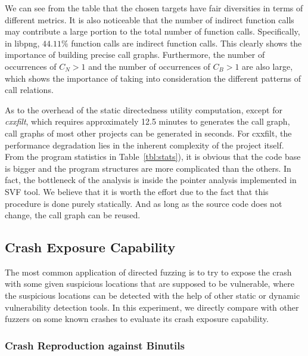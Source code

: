 We can see from  the table that the chosen targets have fair diversities in terms of different metrics.
It is also noticeable that the number of indirect function calls may contribute a large portion to the total number of function calls.
Specifically, in libpng, $44.11\%$ function calls are indirect function calls.
This clearly shows the importance of building precise call graphs.
Furthermore, the number of occurrences of $C_N>1$ and the number of occurrences of $C_B>1$ are also large, which shows the importance of taking into consideration the different patterns of call relations.




As to the overhead of the static directedness utility computation, except for \emph{cxxfilt}, which requires approximately 12.5 minutes to generates the call graph, call graphs of most other projects can be generated in seconds. For cxxfilt, the performance degradation lies in the inherent complexity of the project itself. From the program statistics in Table~\ref{tbl:stats}), it is obvious that the code base is bigger and the program structures are more complicated than the others. In fact, the bottleneck of the analysis is inside the pointer analysis implemented in SVF tool. We believe that it is worth the effort due to the fact that this procedure is done purely statically. And as long as the source code does not change, the call graph can be reused.


\subsection{Crash Exposure Capability}\label{subsec:evalcrashrepro}

The most common application of directed fuzzing is to try to expose the crash with some given suspicious locations that are supposed to be vulnerable, where the suspicious locations can be detected with the help of other static or dynamic vulnerability detection tools.
In this experiment, we directly compare {\dFOT} with other fuzzers on some known crashes to evaluate its crash exposure capability.

\subsubsection{Crash Reproduction against Binutils}

